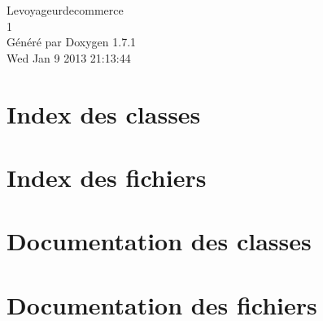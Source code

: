 \documentclass[a4paper]{book}
\begin{document}
\hypersetup{pageanchor=false}
\begin{titlepage}
\vspace*{7cm}
\begin{center}
{\Large Levoyageurdecommerce \\[1ex]\large 1 }\\
\vspace*{1cm}
{\large Généré par Doxygen 1.7.1}\\
\vspace*{0.5cm}
{\small Wed Jan 9 2013 21:13:44}\\
\end{center}
\end{titlepage}
\clearemptydoublepage
{}
\tableofcontents
\clearemptydoublepage
{}
\hypersetup{pageanchor=true}
\chapter{Index des classes}

\chapter{Index des fichiers}

\chapter{Documentation des classes}






\chapter{Documentation des fichiers}



















\printindex
\end{document}
